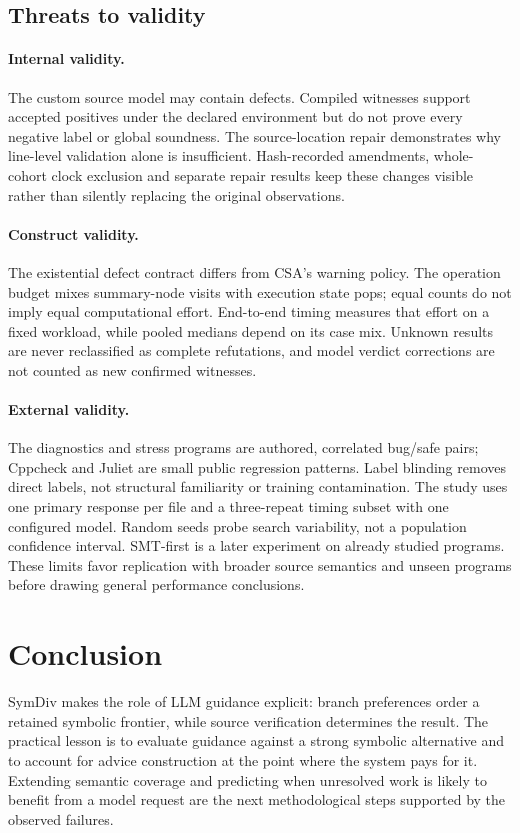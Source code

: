 \documentclass[sigconf]{acmart}
\begin{document}
\subsection{Threats to validity}
\paragraph{Internal validity.}
The custom source model may contain defects. Compiled witnesses support
accepted positives under the declared environment but do not prove every
negative label or global soundness. The source-location repair demonstrates
why line-level validation alone is insufficient. Hash-recorded amendments,
whole-cohort clock exclusion and separate repair results keep these changes
visible rather than silently replacing the original observations.

\paragraph{Construct validity.}
The existential defect contract differs from CSA's warning policy. The
operation budget mixes summary-node visits with execution state pops; equal
counts do not imply equal computational effort. End-to-end timing measures
that effort on a fixed workload, while pooled medians depend on its case mix.
Unknown results are never reclassified as complete refutations, and model
verdict corrections are not counted as new confirmed witnesses.

\paragraph{External validity.}
The diagnostics and stress programs are authored, correlated bug/safe pairs;
Cppcheck and Juliet are small public regression patterns. Label blinding
removes direct labels, not structural familiarity or training contamination.
The study uses one primary response per file and a three-repeat timing
subset with one configured model. Random seeds probe search variability,
not a population confidence interval. SMT-first is a later experiment on
already studied programs. These limits favor replication with broader source
semantics and unseen programs before drawing general performance conclusions.

\section{Conclusion}
SymDiv makes the role of LLM guidance explicit: branch preferences order a
retained symbolic frontier, while source verification determines the result.
\VFourConclusion{}
The practical lesson is to evaluate guidance against a strong symbolic
alternative and to account for advice construction at the point where the
system pays for it. Extending semantic coverage and predicting when unresolved
work is likely to benefit from a model request are the next methodological
steps supported by the observed failures.
\end{document}
